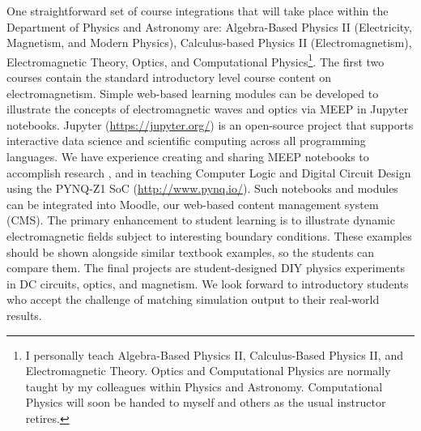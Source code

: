 \documentclass[../../main.tex]{subfiles}
\begin{document}
One straightforward set of course integrations that will take place within the Department of Physics and Astronomy are: Algebra-Based Physics II (Electricity, Magnetism, and Modern Physics), Calculus-based Physics II (Electromagnetism), Electromagnetic Theory, Optics, and Computational Physics\footnote{I personally teach Algebra-Based Physics II, Calculus-Based Physics II, and Electromagnetic Theory.  Optics and Computational Physics are normally taught by my colleagues within Physics and Astronomy.  Computational Physics will soon be handed to myself and others as the usual instructor retires.}.  The first two courses contain the standard introductory level course content on electromagnetism.  Simple web-based learning modules can be developed to illustrate the concepts of electromagnetic waves and optics via MEEP in Jupyter notebooks.  Jupyter (\url{https://jupyter.org/}) is an open-source project that supports interactive data science and scientific computing across all programming languages.  We have experience creating and sharing MEEP notebooks to accomplish research \cite{electronics10040415}, and in teaching Computer Logic and Digital Circuit Design using the PYNQ-Z1 SoC (\url{http://www.pynq.io/}). Such notebooks and modules can be integrated into Moodle, our web-based content management system (CMS).  The primary enhancement to student learning is to illustrate dynamic electromagnetic fields subject to interesting boundary conditions.  These examples should be shown alongside similar textbook examples, so the students can compare them.  The final projects are student-designed DIY physics experiments in DC circuits, optics, and magnetism.  We look forward to introductory students who accept the challenge of matching simulation output to their real-world results. \\ \vspace{2.5mm}
\end{document}
